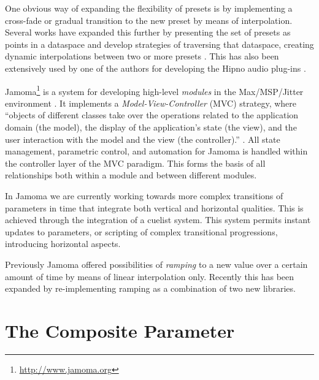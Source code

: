 \documentclass{article}
\begin{document}
One obvious way of expanding the flexibility of presets is by implementing a cross-fade or gradual transition to the new preset by means of interpolation. Several works have expanded this further by presenting the set of presets as points in a dataspace and develop strategies of traversing that dataspace, creating dynamic interpolations between two or more presets \cite{Bencina:2005metasurface, Dahlstedt:2001, Momeni:2003}. This has also been extensively used by one of the authors for developing the Hipno audio plug-ins \cite{Place:2005hipno}.

Jamoma\footnote{\url{http://www.jamoma.org}} is a system for developing high-level \emph{modules} in the Max/MSP/Jitter environment \cite{Place:2006}. It implements a \emph{Model-View-Controller} (MVC) strategy, where ``objects of different classes take over the operations related to the application domain (the model), the display of the application's state (the view), and the user interaction with the model and the view (the controller).'' \cite[p26]{Krasner:1988}. All state management, parametric control, and automation for Jamoma is handled within the controller layer of the MVC paradigm. This forms the basis of all relationships both within a module and between different modules.

In Jamoma we are currently working towards more complex transitions of parameters in time that integrate both vertical and horizontal qualities.  This is achieved through the integration of a cuelist system. This system permits instant updates to parameters, or scripting of complex transitional progressions, introducing horizontal aspects. 

Previously Jamoma offered possibilities of \emph{ramping} to a new value over a certain amount of time by means of linear interpolation only. Recently this has been expanded by re-implementing ramping as a combination of two new libraries.


\section{The Composite Parameter} %
\label{sec:the_composite_parameter}

\end{document}
